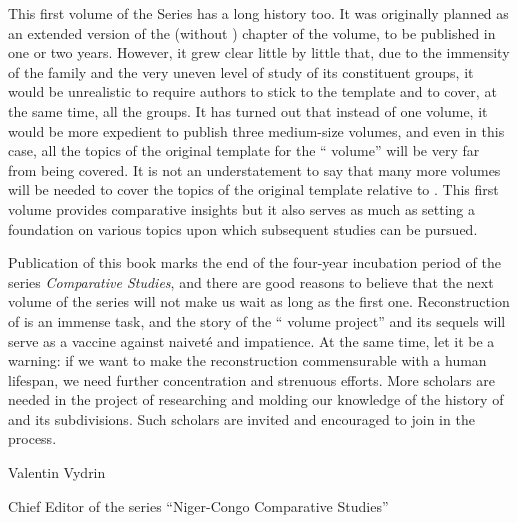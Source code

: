 This first volume of the Series has a long history too. It was originally planned as an extended version of the  (without ) chapter of the  volume, to be published in one or two years. However, it grew clear little by little that, due to the immensity of the  family and the very uneven level of study of its constituent groups, it would be unrealistic to require authors to stick to the template and to cover, at the same time, all the  groups.  It has turned out that instead of one  volume, it would be more expedient to publish three medium-size volumes, and even in this case, all the topics of the original template for the `` volume'' will be very far from being covered. It is not an understatement to say that many more volumes will be needed to cover the topics of the original template relative to . This first volume provides comparative insights but it also serves as much as setting a foundation on various topics upon which subsequent studies can be pursued.

Publication of this book marks the end of the four-year incubation period of the series \textit{ Comparative Studies}, and there are good reasons to believe that the next volume of the series will not  make us wait as long as the first one. Reconstruction of  is an immense task, and the story of the `` volume project'' and its sequels will serve as  a vaccine against naiveté and impatience. At the same time, let it be a warning: if we want to make the  reconstruction commensurable with a human lifespan, we need further concentration and strenuous efforts. More scholars are needed in the project of researching and molding our knowledge of the history of  and its subdivisions. Such scholars are invited and encouraged to join in the process.

\bigskip 

\hfill {Valentin Vydrin}
\bigskip 

\hfill 
Chief Editor of the series ``{Niger-Congo} Comparative Studies''

  
